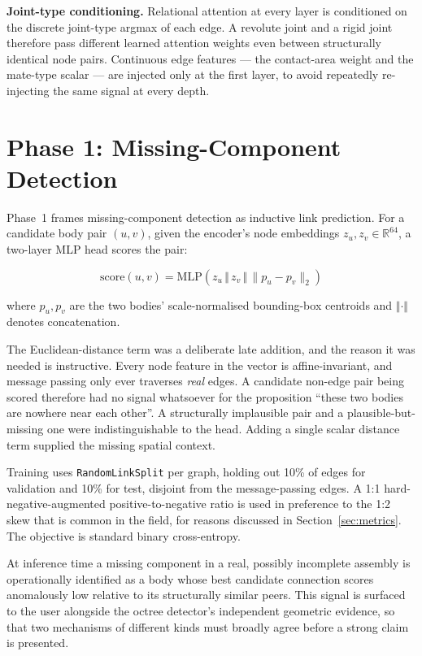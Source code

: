\documentclass[12pt,oneside,a4paper]{report}
\begin{document}
\textbf{Joint-type conditioning.} Relational attention at every layer is
conditioned on the discrete joint-type argmax of each edge. A revolute joint
and a rigid joint therefore pass different learned attention weights even
between structurally identical node pairs. Continuous edge features --- the
contact-area weight and the mate-type scalar --- are injected only at the
first layer, to avoid repeatedly re-injecting the same signal at every depth.

\section{Phase 1: Missing-Component Detection}
\label{sec:phase1}

Phase~1 frames missing-component detection as inductive link prediction. For
a candidate body pair $(u,v)$, given the encoder's node embeddings
$z_u, z_v \in \mathbb{R}^{64}$, a two-layer MLP head scores the pair:

\begin{equation}
\text{score}(u,v) = \text{MLP}\!\left(z_u \,\Vert\, z_v \,\Vert\, \lVert p_u - p_v \rVert_2\right)
\label{eq:linkscore}
\end{equation}

where $p_u, p_v$ are the two bodies' scale-normalised bounding-box centroids
and $\Vert \cdot \Vert$ denotes concatenation.

The Euclidean-distance term was a deliberate late addition, and the reason it
was needed is instructive. Every node feature in the vector is
affine-invariant, and message passing only ever traverses \emph{real} edges.
A candidate non-edge pair being scored therefore had no signal whatsoever for
the proposition ``these two bodies are nowhere near each other''. A
structurally implausible pair and a plausible-but-missing one were
indistinguishable to the head. Adding a single scalar distance term supplied
the missing spatial context.

Training uses \texttt{RandomLinkSplit} per graph, holding out 10\% of edges
for validation and 10\% for test, disjoint from the message-passing edges. A
1:1 hard-negative-augmented positive-to-negative ratio is used in preference
to the 1:2 skew that is common in the field, for reasons discussed in
Section~\ref{sec:metrics}. The objective is standard binary cross-entropy.

At inference time a missing component in a real, possibly incomplete assembly
is operationally identified as a body whose best candidate connection scores
anomalously low relative to its structurally similar peers. This signal is
surfaced to the user alongside the octree detector's independent geometric
evidence, so that two mechanisms of different kinds must broadly agree before
a strong claim is presented.
\end{document}
